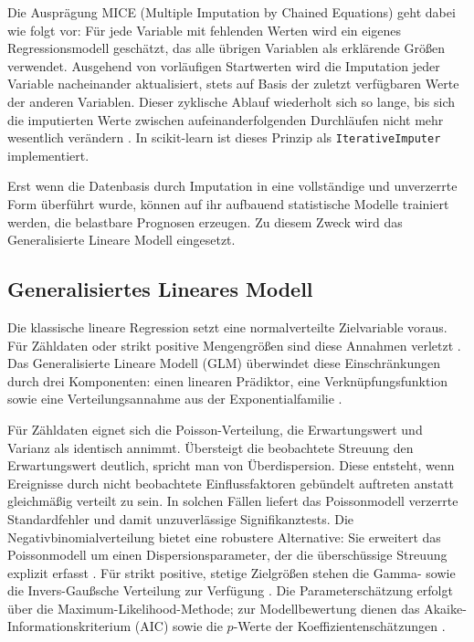 Die Ausprägung MICE (Multiple Imputation by Chained Equations) geht dabei wie folgt vor: Für jede Variable mit fehlenden Werten wird ein eigenes Regressionsmodell geschätzt, das alle übrigen Variablen als erklärende Größen verwendet. Ausgehend von vorläufigen Startwerten wird die Imputation jeder Variable nacheinander aktualisiert, stets auf Basis der zuletzt verfügbaren Werte der anderen Variablen. Dieser zyklische Ablauf wiederholt sich so lange, bis sich die imputierten Werte zwischen aufeinanderfolgenden Durchläufen nicht mehr wesentlich verändern \parencite[vgl.][S.~5~ff.]{vanBuuren.2011}. In scikit-learn ist dieses Prinzip als \texttt{IterativeImputer} implementiert.

Erst wenn die Datenbasis durch Imputation in eine vollständige und unverzerrte Form überführt wurde, können auf ihr aufbauend statistische Modelle trainiert werden, die belastbare Prognosen erzeugen. Zu diesem Zweck wird das Generalisierte Lineare Modell eingesetzt.

\subsection{Generalisiertes Lineares Modell}
Die klassische lineare Regression setzt eine normalverteilte Zielvariable voraus. Für Zähldaten oder strikt positive Mengengrößen sind diese Annahmen verletzt \parencite[vgl.][S.~1~ff.]{McCullagh.1989}. Das Generalisierte Lineare Modell (GLM) überwindet diese Einschränkungen durch drei Komponenten: einen linearen Prädiktor, eine Verknüpfungsfunktion sowie eine Verteilungsannahme aus der Exponentialfamilie \parencite[vgl.][S.~370~ff.]{Nelder.1972}.

Für Zähldaten eignet sich die Poisson-Verteilung, die Erwartungswert und Varianz als identisch annimmt. Übersteigt die beobachtete Streuung den Erwartungswert deutlich, spricht man von Überdispersion. Diese entsteht, wenn Ereignisse durch nicht beobachtete Einflussfaktoren gebündelt auftreten anstatt gleichmäßig verteilt zu sein. In solchen Fällen liefert das Poissonmodell verzerrte Standardfehler und damit unzuverlässige Signifikanztests. Die Negativbinomialverteilung bietet eine robustere Alternative: Sie erweitert das Poissonmodell um einen Dispersionsparameter, der die überschüssige Streuung explizit erfasst \parencite[vgl.][S.~80~f.]{Cameron.2013}. Für strikt positive, stetige Zielgrößen stehen die Gamma- sowie die Invers-Gaußsche Verteilung zur Verfügung \parencite[vgl.][S.~285~ff.]{McCullagh.1989}. Die Parameterschätzung erfolgt über die Maximum-Likelihood-Methode; zur Modellbewertung dienen das Akaike-Informationskriterium (AIC) sowie die $p$-Werte der Koeffizientenschätzungen \parencite[vgl.][S.~86~ff.]{Fahrmeir.2001}.